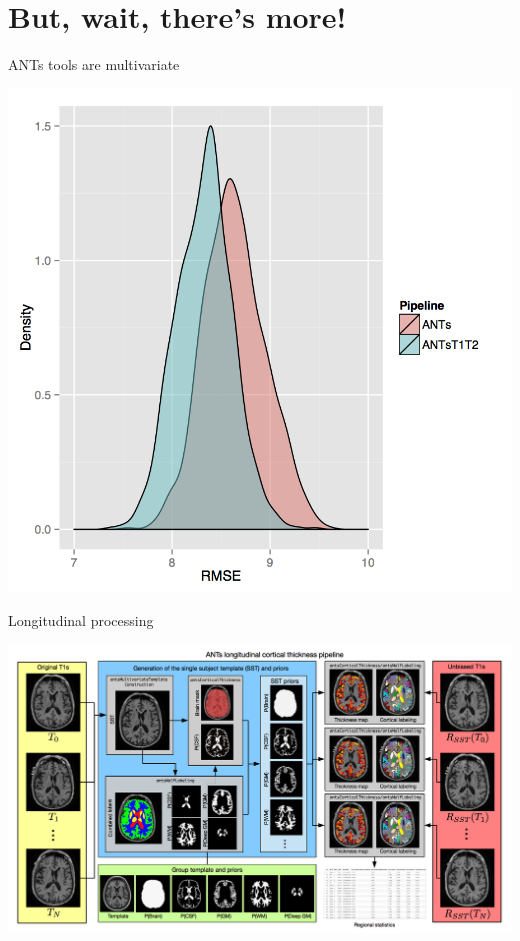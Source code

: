 \documentclass[ignorenonframetext,]{beamer}
\begin{document}
\section{But, wait, there's more!}\label{but-wait-theres-more}

\begin{frame}{ANTs tools are multivariate}

\includegraphics{./evaluation/figures/rfRmse05ANTsT1T2.png}

\end{frame}

\begin{frame}{Longitudinal processing}

\includegraphics{./longitudinal/figures/longitudinalPipeline.png}

\end{frame}
\end{document}
